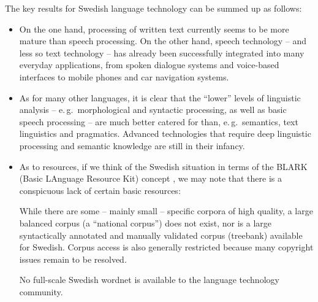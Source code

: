 \begin{multicols}{2}
The key results for Swedish language technology can be summed up as follows:

\begin{itemize}
\item On the one hand, processing of written text currently seems to
  be more mature than speech processing. On the other hand, speech
  technology -- and less so text technology -- has already been
  successfully integrated into many everyday applications, from spoken
  dialogue systems and voice-based interfaces to mobile phones and car
  navigation systems.
\item As for many other languages, it is clear that the ``lower''
  levels of linguistic analysis -- e.\,g.~morphological and syntactic
  processing, as well as basic speech processing -- are much better
  catered for than, e.\,g.~semantics, text linguistics and
  pragmatics. Advanced technologies that require deep linguistic
  processing and semantic knowledge are still in their infancy.
\item As to resources, if we think of the Swedish situation in terms
  of the BLARK (Basic LAnguage Resource Kit) concept \cite{blark,sweblark}, we
  may note that there is a conspicuous lack of certain basic
  resources:

While there are some -- mainly small -- specific corpora of high
quality, a large balanced corpus (a ``national corpus'') \cite{SNK}
does not exist, nor is a large syntactically annotated and manually
validated corpus (treebank) available for Swedish. Corpus access is
also generally restricted because many copyright issues remain to be
resolved.

No full-scale Swedish wordnet is available to the language
  technology community.


\end{itemize}
\end{multicols}
